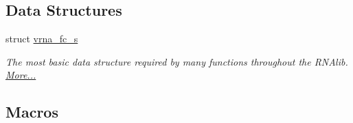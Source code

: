 \subsection*{Data Structures}
\begin{DoxyCompactItemize}
\item 
struct \hyperlink{group__fold__compound_structvrna__fc__s}{vrna\+\_\+fc\+\_\+s}
\begin{DoxyCompactList}\small\item\em The most basic data structure required by many functions throughout the R\+N\+Alib.  \hyperlink{group__fold__compound_structvrna__fc__s}{More...}\end{DoxyCompactList}\end{DoxyCompactItemize}
\subsection*{Macros}
